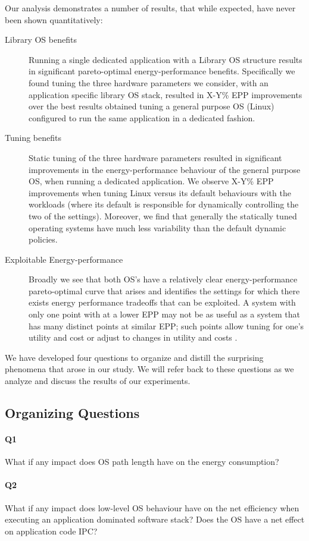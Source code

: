 Our analysis demonstrates  a number of  results, that while expected, have never been shown quantitatively: 
\begin{description}
\item[Library OS benefits] Running a single dedicated application with a Library OS structure results in significant pareto-optimal energy-performance benefits.  Specifically we found tuning the three hardware parameters we consider, with an application specific library OS stack, resulted in X-Y\% EPP improvements over the best results obtained tuning a general purpose OS (Linux) configured to run the same application in a dedicated fashion.
\item[Tuning benefits] Static tuning of the three hardware parameters resulted in significant improvements in the energy-performance behaviour of the general purpose OS, when running a dedicated application.   We observe X-Y\% EPP improvements when tuning Linux versus its default behaviours with the workloads (where its default is responsible for dynamically controlling the two of the settings). Moreover, we find that generally the statically tuned operating systems have much less variability than the default dynamic policies.
\item[Exploitable Energy-performance] Broadly we see that both OS's have a relatively clear energy-performance pareto-optimal curve that arises and identifies the settings for which there exists energy performance tradeoffs that can be exploited.
A system with only one point with at a lower EPP may not be as useful as a system that has many distinct points at similar EPP; such points allow tuning for one's utility and cost or adjust to changes in utility and costs . 
\end{description}
  
We have developed four questions to organize and distill the surprising phenomena that arose in our study.  We will refer back to these questions as we analyze and discuss the results of our experiments. 
\subsection{Organizing Questions}
\label{sec:questions}
\paragraph{Q1} 
\label{sec:q1}
What if any impact does OS path length have on the energy consumption?
\paragraph{Q2}
\label{sec:Q2}
What if any impact does low-level OS behaviour have on the net efficiency when executing an application dominated software stack? 
Does the OS have a net effect on application code IPC?
